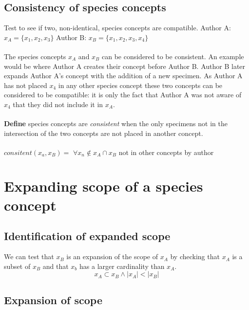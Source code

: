 \documentclass{article}
\begin{document}
   \subsection{Consistency of species concepts}
   Test to see if two, non-identical, species concepts are compatible.
   \newline\newline
   Author A: $x_A = \{x_1, x_2, x_3\}$ \newline
   Author B: $x_B = \{x_1, x_2, x_3, x_4\}$ 
   \paragraph{}
   The species concepts $x_A$ and $x_B$ can be considered to be consistent. An example would be where Author A creates their concept before Author B. Author B later expands Author A's concept with the addition of a new specimen. As Author A has not placed $x_4$ in any other species concept these two concepts can be considered to be compatible: it is only the fact that Author A was not aware of $x_4$ that they did not include it in $x_A$.
   \paragraph{}
   \textbf{Define} species concepts are \textit{consistent} when the only specimens not in the intersection of the two concepts are not placed in another concept.
   \paragraph{}
   $consitent(x_a,x_B) =$ $\forall x_n \notin x_A \cap x_B$ not in other concepts by author
   
   \section{Expanding scope of a species concept}
   \subsection{Identification of expanded scope}
   We can test that $x_B$ is an expansion of the scope of $x_A$ by checking that $x_A$ is a subset of $x_B$ and that $x_b$ has a larger cardinality than $x_A$.
   \[x_A \subset x_B \land \left|x_A\right| < \left|x_B\right|\]
   
   \subsection{Expansion of scope}
\end{document}
